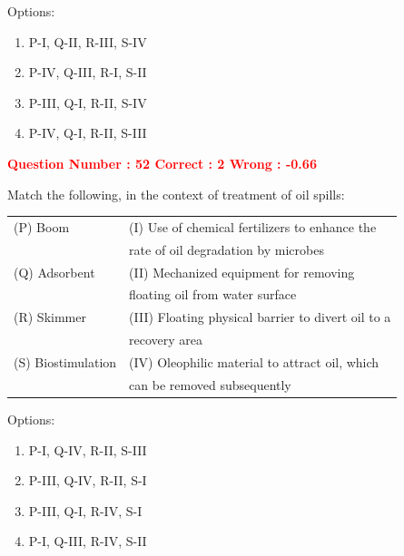 \documentclass[12pt]{article}
\begin{document}
{\vspace{1em}

Options:
\begin{enumerate}[label=(\Alph*)]
    \item P-I, Q-II, R-III, S-IV  
    \item P-IV, Q-III, R-I, S-II  
    \item P-III, Q-I, R-II, S-IV  
    \item P-IV, Q-I, R-II, S-III  
\end{enumerate}


\textcolor{red}{\textbf{Question Number : 52 \hfill Correct : 2  Wrong : -0.66}}

\vspace{0.5em}

Match the following, in the context of treatment of oil spills:

\vspace{0.5em}

\begin{tabular}{ll}
(P) Boom          & (I) Use of chemical fertilizers to enhance the \\
                  & \hfill rate of oil degradation by microbes \\
(Q) Adsorbent     & (II) Mechanized equipment for removing \\
                  & \hfill floating oil from water surface \\
(R) Skimmer       & (III) Floating physical barrier to divert oil to a \\
                  & \hfill recovery area \\
(S) Biostimulation & (IV) Oleophilic material to attract oil, which \\
                  & \hfill can be removed subsequently \\
\end{tabular}

\vspace{1em}

Options:
\begin{enumerate}[label=(\Alph*)]
    \item P-I, Q-IV, R-II, S-III  
    \item P-III, Q-IV, R-II, S-I  
    \item P-III, Q-I, R-IV, S-I  
    \item P-I, Q-III, R-IV, S-II  
\end{enumerate}

\vspace{1em}

}
\end{document}

